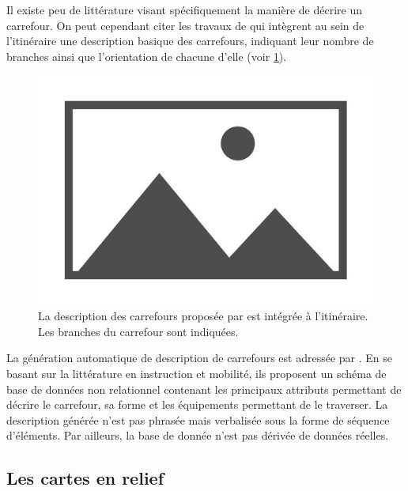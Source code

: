 

\newpar{}

Il existe peu de littérature visant spécifiquement la manière de décrire un carrefour. On peut cependant citer les travaux de \cite{gaunet_verbal_2006} qui intègrent au sein de l'itinéraire une description basique des carrefours, indiquant leur nombre de branches ainsi que l'orientation de chacune d'elle (voir \ref{fig:exdesccarrefour}).

\begin{figure}
    \centering
    \includegraphics{images/placeholder.jpg}
    \caption{La description des carrefours proposée par \cite{gaunet_verbal_2006} est intégrée à l'itinéraire. Les branches du carrefour sont indiquées.}
    \label{fig:exdesccarrefour}
\end{figure}

La génération automatique de description de carrefours est adressée par \cite{Guth2019}. En se basant sur la littérature en instruction et mobilité, ils proposent un schéma de base de données non relationnel contenant les principaux attributs permettant de décrire le carrefour, sa forme et les équipements permettant de le traverser. La description générée n'est pas phrasée mais verbalisée sous la forme de séquence d'éléments. Par ailleurs, la base de donnée n'est pas dérivée de données réelles.

\subsection{Les cartes en relief}

